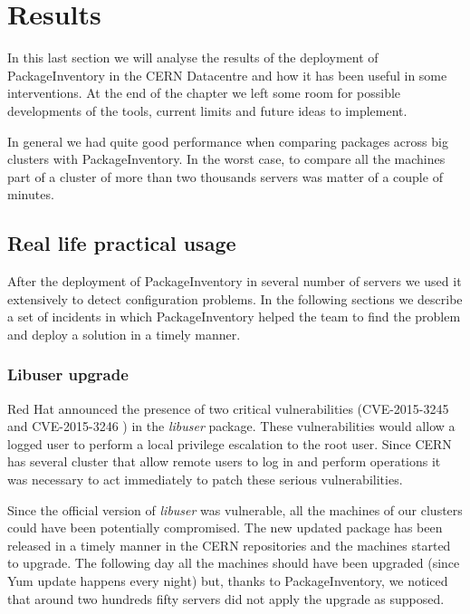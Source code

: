 \section{Results}

In this last section we will analyse the results of the deployment of
PackageInventory in the CERN Datacentre and how it has been useful in some
interventions. At the end of the chapter we left some room for possible
developments of the tools, current limits and future ideas to implement.

In general we had quite good performance when comparing packages across
big clusters with PackageInventory. In the worst case, to compare all the
machines part of a cluster of more than two thousands servers was matter
of a couple of minutes.

\subsection{Real life practical usage}

After the deployment of PackageInventory in several number of servers we
used it extensively to detect configuration problems. In the following
sections we describe a set of incidents in which PackageInventory helped
the team to find the problem and deploy a solution in a timely manner.

  \subsubsection{Libuser upgrade}

  Red Hat announced the presence of two critical vulnerabilities
  (CVE-2015-3245 \cite{cve-2015-3245} and CVE-2015-3246
  \cite{cve-2015-3246}) in the \textit{libuser} package. These
  vulnerabilities would allow a logged user to perform a local privilege
  escalation to the root user. Since CERN has several cluster that allow
  remote users to log in and perform operations it was necessary to act
  immediately to patch these serious vulnerabilities.

  Since the official version of \textit{libuser} was vulnerable, all the
  machines of our clusters could have been potentially compromised. The
  new updated package has been released in a timely manner in the CERN
  repositories and the machines started to upgrade. The following day all
  the machines should have been upgraded (since Yum update happens every
  night) but, thanks to PackageInventory, we noticed that around two
  hundreds fifty servers did not apply the upgrade as supposed.

